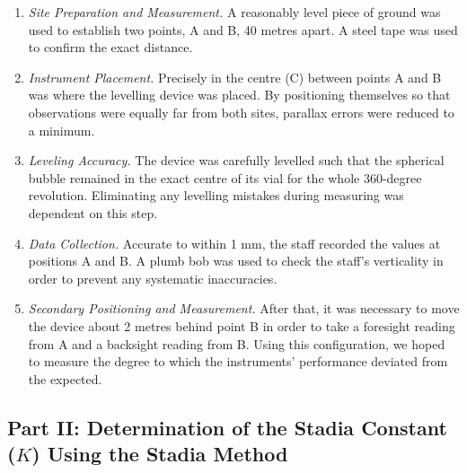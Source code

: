 \documentclass[12pt]{report}
\begin{document}
\begin{enumerate}

\item  \textit{Site Preparation and Measurement.} A reasonably level piece of ground was used to establish two points, A and B, 40 metres apart. A steel tape was used to confirm the exact distance.

\item \textit{Instrument Placement.} Precisely in the centre (C) between points A and B was where the levelling device was placed. By positioning themselves so that observations were equally far from both sites, parallax errors were reduced to a minimum.

\item \textit{Leveling Accuracy.} The device was carefully levelled such that the spherical bubble remained in the exact centre of its vial for the whole 360-degree revolution. Eliminating any levelling mistakes during measuring was dependent on this step.

\item \textit{Data Collection.} Accurate to within 1 mm, the staff recorded the values at positions A and B. A plumb bob was used to check the staff's verticality in order to prevent any systematic inaccuracies.

\item \textit{Secondary Positioning and Measurement.} After that, it was necessary to move the device about 2 metres behind point B in order to take a foresight reading from A and a backsight reading from B. Using this configuration, we hoped to measure the degree to which the instruments' performance deviated from the expected.
\end{enumerate}


\subsection*{Part II: Determination of the Stadia Constant (\(K\)) Using the Stadia Method}
\end{document}
